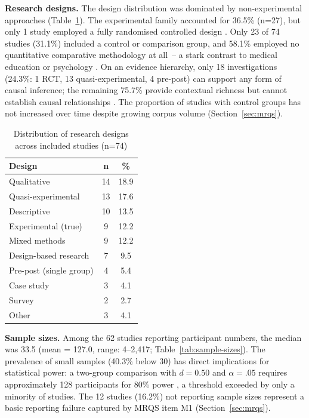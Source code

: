 \textbf{Research designs.} \label{sec:research-designs}
The design distribution was dominated by non-experimental approaches (Table~\ref{tab:research-designs}). The experimental family accounted for 36.5\% (n=27), but only 1 study employed a fully randomised controlled design \cite{Schulz2010CONSORT}. Only 23 of 74 studies (31.1\%) included a control or comparison group, and 58.1\% employed no quantitative comparative methodology at all~-- a stark contrast to medical education or psychology \cite{GuyattGRADE2008, SterneEtAl2016}. On an evidence hierarchy, only 18 investigations (24.3\%: 1 RCT, 13 quasi-experimental, 4 pre-post) can support any form of causal inference; the remaining 75.7\% provide contextual richness but cannot establish causal relationships \cite{vanGaalen2021}. The proportion of studies with control groups has not increased over time despite growing corpus volume (Section~\ref{sec:mrqs}).

\begin{table}[!h]
\centering
\caption{Distribution of research designs across included studies (n=74)}
\label{tab:research-designs}
\small
\begin{tabular}{lcc}
\hline
\textbf{Design} & \textbf{n} & \textbf{\%} \\
\hline
Qualitative & 14 & 18.9 \\
Quasi-experimental & 13 & 17.6 \\
Descriptive & 10 & 13.5 \\
Experimental (true) & 9 & 12.2 \\
Mixed methods & 9 & 12.2 \\
Design-based research & 7 & 9.5 \\
Pre-post (single group) & 4 & 5.4 \\
Case study & 3 & 4.1 \\
Survey & 2 & 2.7 \\
Other & 3 & 4.1 \\
\hline
\end{tabular}
\end{table}

\textbf{Sample sizes.}
Among the 62 studies reporting participant numbers, the median was 33.5 (mean = 127.0, range: 4--2,417; Table~\ref{tab:sample-sizes}). The prevalence of small samples (40.3\% below 30) has direct implications for statistical power: a two-group comparison with $d = 0.50$ and $\alpha = .05$ requires approximately 128 participants for 80\% power \cite{Cohen1960}, a threshold exceeded by only a minority of studies. The 12 studies (16.2\%) not reporting sample sizes represent a basic reporting failure captured by MRQS item M1 (Section~\ref{sec:mrqs}).

